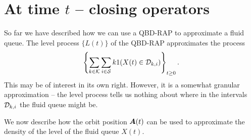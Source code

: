 
\section{At time \(t\) -- closing operators}\label{sec: closing}
So far we have described how we can use a QBD-RAP to approximate a fluid queue. The level process \(\{L(t)\}\) of the QBD-RAP approximates the process 
\begin{align}
	\displaystyle \left\{\sum_{k\in\mathcal K}\sum_{i\in\mathcal{S}} k1(X(t)\in\mathcal{D}_{k,i})\right\}_{t\geq 0}. \label{eqn: kfafj}
\end{align}
This may be of interest in its own right. However, it is a somewhat granular approximation -- the level process tells us nothing about where in the intervals \(\mathcal{D}_{k,i}\) the fluid queue might be. 

We now describe how the orbit position \(\boldsymbol A(t)\) can be used to approximate the density of the level of the fluid queue \(X(t)\).


